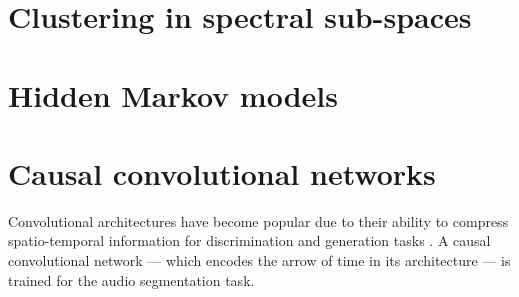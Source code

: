 \documentclass{article}[12pt]
\numberwithin{equation}{section}
\begin{document}
\section{Clustering in spectral sub-spaces} \vspace{-10pt}

\section{Hidden Markov models} \vspace{-10pt}
\section{Causal convolutional networks}
Convolutional architectures have become popular due to their ability to compress spatio-temporal
information for discrimination and generation tasks \cite{Oord2016PixelNetworks,GoodfellowGenerativeNets}.
A causal convolutional network \cite{Oord2016WaveNet:Audio} --- which encodes the arrow of time in
its architecture --- is trained for the audio segmentation task.




\end{document}
